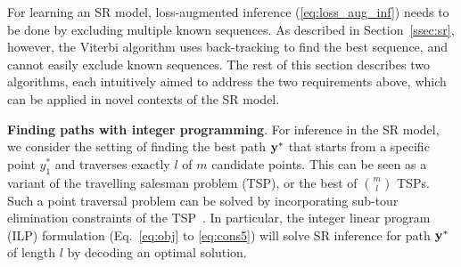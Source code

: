 For learning an SR model, loss-augmented inference (\ref{eq:loss_aug_inf}) needs to be done by excluding multiple known sequences.
As described in Section~\ref{ssec:sr}, %
however, the Viterbi algorithm uses back-tracking to find the best sequence,
and cannot easily exclude known sequences.
The rest of this section describes two algorithms, each intuitively aimed to address %
the two requirements above, which can be applied in novel contexts of the SR model.


\textbf{Finding paths with integer programming}.
For inference in the SR model, 
we consider the setting of finding the best path $\mathbf{y}^*$ that starts from a specific point $y_1^*$ and traverses exactly $l$ of $m$ candidate points.
This can be seen as a variant of the travelling salesman problem (TSP), or the best of ${m \choose l}$ TSPs.
Such a point traversal problem can be solved by incorporating
sub-tour elimination constraints of the TSP~\cite{ijcai15,cikm16paper}.
In particular, the integer linear program (ILP) formulation (Eq.~\ref{eq:obj} to \ref{eq:cons5})
will solve SR inference for path $\mathbf{y}^*$ of length $l$ by decoding an optimal solution.

